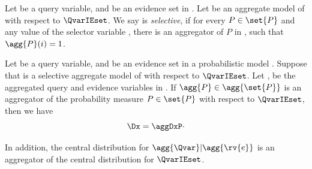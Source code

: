 \begin{definition}
    Let \Qvar be a query variable, and \Eset be an evidence set in \model.
    Let \Magg be an aggregate model of \M with respect to $\QvarIEset$.
    We say \Magg is \emph{selective}, if for every $P \in \set{P}$ and any value  of the selector
    variable , there is an aggregator of $P$ in \Magg, such that $\agg{P}(i) = 1$.

\end{definition}


\begin{theorem}
    Let \Qvar be a query variable, and \Eset be an evidence set in a probabilistic model \model.
    Suppose that \aggmodel is a selective aggregate model of \M with respect to $\QvarIEset$.
    Let ,  be the aggregated query and evidence variables in \Magg.
    If $\agg{P} \in \agg{\set{P}}$ is an aggregator of the probability measure $P \in \set{P}$
    with respect to $\QvarIEset$, then we have
    \begin{equation*}
        \Dx = \aggDxP \cdot
    \end{equation*}

    In addition, the central distribution for $\agg{\Qvar}|\agg{\rv{e}}$ is an aggregator of the central
    distribution for $\QvarIEset$.
\end{theorem}

